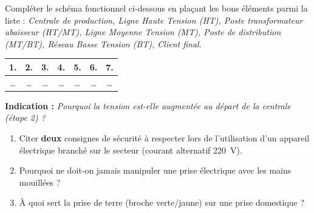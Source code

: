 \documentclass[11pt]{article}
\begin{document}
\begin{exercice}
Compléter le schéma fonctionnel ci-dessous en plaçant les bons éléments parmi la liste : \textit{Centrale de production, Ligne Haute Tension (HT), Poste transformateur abaisseur (HT/MT), Ligne Moyenne Tension (MT), Poste de distribution (MT/BT), Réseau Basse Tension (BT), Client final}.
\begin{center}
\begin{tabular}{|c|c|c|c|c|c|c|}
\hline
\textbf{1.} & \textbf{2.} & \textbf{3.} & \textbf{4.} & \textbf{5.} & \textbf{6.} & \textbf{7.} \\
\hline
\ldots & \ldots & \ldots & \ldots & \ldots & \ldots & \ldots \\
\hline
\end{tabular}
\end{center}
\textbf{Indication :} \textit{Pourquoi la tension est-elle augmentée au départ de la centrale (étape 2) ?}
\end{exercice}

\begin{exercice}
\begin{enumerate}
    \item Citer \textbf{deux} consignes de sécurité à respecter lors de l'utilisation d'un appareil électrique branché sur le secteur (courant alternatif \SI{220}{V}).
    \item Pourquoi ne doit-on jamais manipuler une prise électrique avec les mains mouillées ?
    \item À quoi sert la prise de terre (broche verte/jaune) sur une prise domestique ?
\end{enumerate}
\end{exercice}
\end{document}
